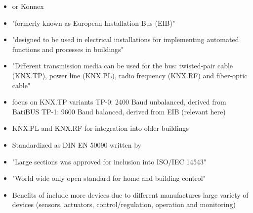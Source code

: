 	\begin{itemize}
		\item \knx or Konnex
		\item "formerly known as European Installation Bus (EIB)" \parencite{Merz2009}
		\item "designed to be used in electrical installations for implementing automated functions and processes in buildings" \parencite{Merz2009}
		\item "Different transmission media can be used for the bus: twisted-pair cable (KNX.TP), power line (KNX.PL), radio frequency (KNX.RF) and fiber-optic cable" \parencite{Merz2009}
		\item focus on KNX.TP
			 variants
			\subitem TP-0: 2400 Baud unbalanced, derived from BatiBUS \parencite{CENELEC2004} \parencite{DIN_EN_50090-5-2}
			\subitem TP-1: 9600 Baud balanced, derived from EIB (relevant here) \parencite{CENELEC2004} \parencite{DIN_EN_50090-5-2}
		\item KNX.PL and KNX.RF for integration into older buildings \parencite{Merz2009}
		\item Standardized as DIN EN 50090 written by \textcite{CENELEC2004} \parencite{DIN_EN_50090-5-2}
		\item "Large sections was approved for inclusion into ISO/IEC 14543" \parencite{Merz2009}
		\item "World wide only open standard for home and building control" \parencite{Merz2009}
		\item Benefits of \knx include
			\subitem more devices due to different manufactures
			\subitem large variety of devices (sensors, actuators, control/regulation, operation and monitoring)
	\end{itemize}
	
